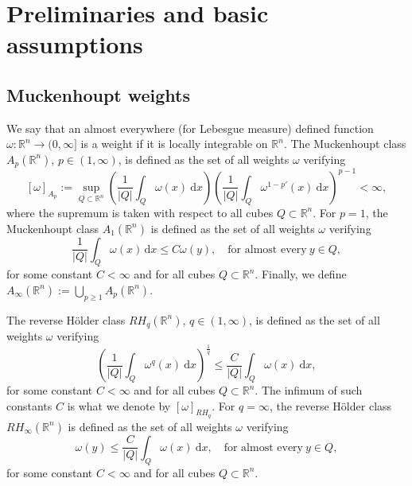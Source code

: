 \documentclass[12pt, letterpaper]{amsart}
\theoremstyle{definition}
\theoremstyle{remark}
\numberwithin{equation}{section}
\begin{document}
\section{Preliminaries and basic assumptions}\label{section 2}

\subsection{Muckenhoupt weights}

We say that an almost everywhere (for Lebesgue measure) defined function $\omega : \mathbb{R}^n \rightarrow (0,\infty]$ is a weight if it is locally integrable on $\mathbb{R}^n$. The Muckenhoupt class $A_p(\mathbb{R}^n)$, $p\in (1,\infty)$, is defined as the set of all weights $\omega$  verifying 
\begin{equation}\label{MuckWeight}
      [ \omega  ]_{A_p}:= \sup_{Q \subset \mathbb{R}^n  } \left ( \frac{1}{|Q|} \int_Q \omega(x) \ \mathrm{d}x   \right ) \left ( \frac{1}{|Q|} \int_Q \omega^{1-p'}(x) \ \mathrm{d}x   \right )^{p-1} < \infty,
\end{equation}
where the supremum is taken with respect to all cubes $Q \subset \mathbb{R}^n$. For $p=1$, the Muckenhoupt class $A_1(\mathbb{R}^n)$ is defined as the set of all weights $\omega$  verifying
\begin{equation*}
    \frac{1}{|Q|} \int_Q \omega(x) \, \mathrm{d}x \leq C \omega(y), \quad \text{for almost every} \ y \in Q,
\end{equation*}
for some constant $C <\infty$ and for all cubes $Q \subset \mathbb{R}^n$. Finally, we define $A_\infty(\mathbb{R}^n):= \bigcup_{p\ge1} A_p(\mathbb{R}^n)$.

The reverse H\"older class $RH_q(\mathbb{R}^n)$, $q\in (1,\infty)$, is defined as the set of all weights $\omega$ verifying 
\begin{equation*}
    \left ( \frac{1}{|Q|} \int_Q \omega^q(x) \ \mathrm{d}x   \right )^{\frac{1}{q}} \leq \frac{C}{|Q|} \int_Q \omega(x) \ \mathrm{d}x,
\end{equation*}
for some constant $C <\infty$ and for all cubes $Q \subset \mathbb{R}^n$. The infimum of such constants $C$ is what we denote by $[ \omega  ]_{RH_q}$. For $q=\infty$, the reverse H\"older class $RH_\infty(\mathbb{R}^n)$ is defined as the set of all weights $\omega $ verifying 
\begin{equation*}
    \omega(y) \leq  \frac{C}{|Q|} \int_Q \omega(x) \ \mathrm{d}x, \quad \text{for almost every} \ y \in Q,
\end{equation*}
for some constant $C <\infty$ and for all cubes $Q \subset \mathbb{R}^n$.
\end{document}
